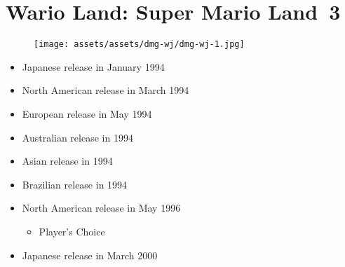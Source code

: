 \documentclass{book}
\begin{document}
\begingroup \chapter*{Wario Land: Super Mario Land~3} \endgroup
\begin{figure}[H]
\vskip 4pt
\centering
\texttt{[image: assets/assets/dmg-wj/dmg-wj-1.jpg]}\end{figure}
\begin{itemize} [nosep]




\item Japanese release in January 1994







\item North American release in March 1994







\item European release in May 1994







\item Australian release in 1994







\item Asian release in 1994







\item Brazilian release in 1994







\item North American release in May 1996
\begin{itemize} [nosep]\item Player’s Choice\end{itemize}\noindent






\item Japanese release in March 2000








\end{itemize}
\end{document}
